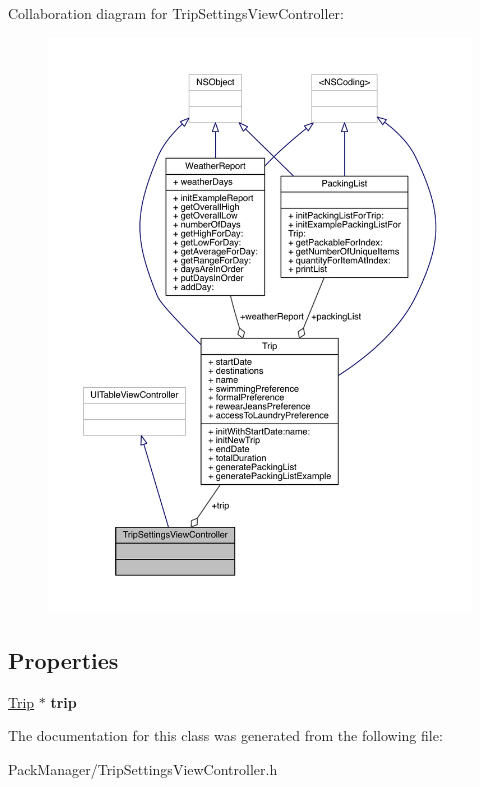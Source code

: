 Collaboration diagram for Trip\-Settings\-View\-Controller\-:\nopagebreak
\begin{figure}[H]
\begin{center}
\leavevmode
\includegraphics[width=350pt]{interface_trip_settings_view_controller__coll__graph}
\end{center}
\end{figure}
\subsection*{Properties}
\begin{DoxyCompactItemize}
\item 
\hypertarget{interface_trip_settings_view_controller_a2faba5a7d0de3f72b88a18801c2b0be4}{\hyperlink{interface_trip}{Trip} $\ast$ {\bfseries trip}}\label{interface_trip_settings_view_controller_a2faba5a7d0de3f72b88a18801c2b0be4}

\end{DoxyCompactItemize}


The documentation for this class was generated from the following file\-:\begin{DoxyCompactItemize}
\item 
Pack\-Manager/Trip\-Settings\-View\-Controller.\-h\end{DoxyCompactItemize}
